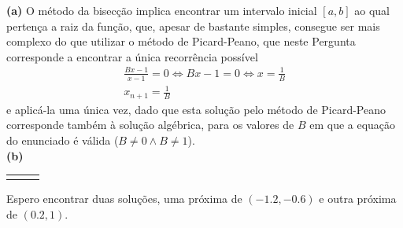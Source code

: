 \setcounter{chapter}{16}
\textbf{(a)} O método da bisecção implica encontrar um intervalo inicial $[a,b]$ ao qual pertença a raiz da função, que, apesar de bastante simples, consegue ser mais complexo do que utilizar o método de Picard-Peano, que neste Pergunta corresponde a encontrar a única recorrência possível
\begin{gather*}
	\frac{Bx-1}{x-1}=0 \iff Bx-1=0 \iff x=\frac{1}{B}\\
	x_{n+1}=\frac{1}{B}
\end{gather*}
e aplicá-la uma única vez, dado que esta solução pelo método de Picard-Peano corresponde também à solução algébrica, para os valores de $B$ em que a equação do enunciado é válida ($B\neq 0 \wedge B\neq 1$).\\
\textbf{(b)}

\begin{center}
\begin{tabular}{ p{73mm} p{0mm} p{73mm} }
	 & &
	
\end{tabular}
\end{center}

Espero encontrar duas soluções, uma próxima de $(-1.2,-0.6)$ e outra próxima de $(0.2,1)$.

